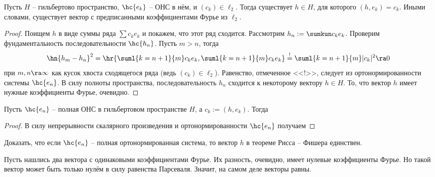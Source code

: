 \documentclass[a4paper]{article}
\begin{document}
\begin{theorem}
Пусть $H$ -- гильбертово пространство, $\hc{e_k}$ -- ОНС в нём, и $(c_k) \in \ell_2$. Тогда
существует $h \in H$, для которого $(h,e_k) = c_k$. Иными словами, существует вектор с предписанными
коэффициентами Фурье из $\ell_2$.
\end{theorem}
\begin{proof}
Поищем $h$ в виде суммы ряда $\sum c_k e_k$ и покажем, что этот ряд сходится. Рассмотрим
$h_n := \sumkun c_k e_k$. Проверим фундаментальность последовательности $\hc{h_n}$.
Пусть $m > n$, тогда
$$
  \hn{h_m - h_n}^2 = \hr{ \suml{k=n+1}{m}c_k e_k, \suml{k=n+1}{m} c_k e_k  } \stackrel{!}{=}
  \suml{k=n+1}{m}|c_k|^2 \ra 0
$$
при $m, n \ra \infty$ как кусок хвоста сходящегося ряда (ведь $(c_k) \in \ell_2$).
Равенство, отмеченное <<!>>, следует из ортонормированности системы $\hc{e_n}$.
В силу полноты пространства, последовательность $h_n$ сходится к некоторому вектору $h \in H$.
То, что вектор $h$ имеет нужные коэффициенты Фурье, очевидно.
\end{proof}

\begin{stm}
Пусть $\hc{e_n}$ -- полная ОНС в гильбертовом пространстве $H$, а $c_k := (h,e_k)$. Тогда
\end{stm}
\begin{proof}
В силу непрерывности скалярного произведения и ортонормированности $\hc{e_n}$ получаем
\end{proof}

\begin{problem}
\label{pr:fourier-coeff-uniqueness}
Доказать, что если $\hc{e_n}$ -- полная ортонормированная система, то вектор $h$ в теореме
Рисса -- Фишера единствен.
\end{problem}
\begin{solution}
Пусть нашлись два вектора с одинаковыми коэффициентами Фурье. Их разность,
очевидно, имеет нулевые коэффициенты Фурье. Но такой вектор может быть
только нулём в силу равенства Парсеваля. Значит, на самом деле векторы равны.
\end{solution}
\end{document}
